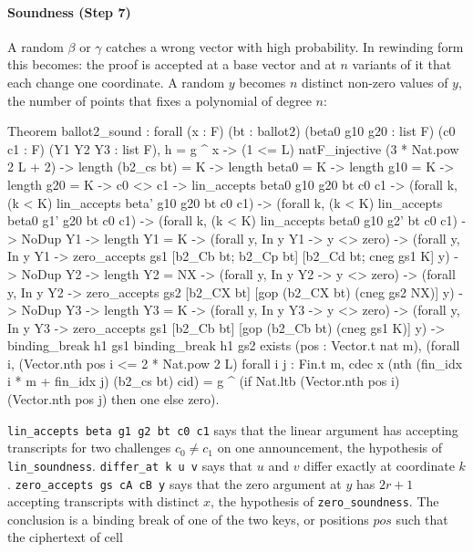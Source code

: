 \documentclass[11pt,a4paper]{article}
\newcommand{\rocq}[1]{\texttt{#1}}
\theoremstyle{remark}
\begin{document}
\paragraph{Soundness (Step 7)} A random $\beta$ or $\gamma$ catches a
wrong vector with high probability. In rewinding form this becomes: the
proof is accepted at a base vector and at $n$ variants of it that each
change one coordinate. A random $y$ becomes $n$ distinct non-zero values
of $y$, the number of points that fixes a polynomial of degree $n$:
\begin{coq}
Theorem ballot2_sound : forall (x : F) (bt : ballot2) (beta0 g10 g20 : list F)
  (c0 c1 : F) (Y1 Y2 Y3 : list F),
  h = g ^ x -> (1 <= L)%
  natF_injective (3 * Nat.pow 2 L + 2) ->
  length (b2_cs bt) = K -> length beta0 = K -> length g10 = K -> length g20 = K ->
  c0 <> c1 ->
  lin_accepts beta0 g10 g20 bt c0 c1 ->
  (forall k, (k < K)%
     lin_accepts beta' g10 g20 bt c0 c1) ->
  (forall k, (k < K)%
     lin_accepts beta0 g1' g20 bt c0 c1) ->
  (forall k, (k < K)%
     lin_accepts beta0 g10 g2' bt c0 c1) ->
  NoDup Y1 -> length Y1 = K -> (forall y, In y Y1 -> y <> zero) ->
  (forall y, In y Y1 -> zero_accepts gs1 [b2_Cb bt; b2_Cp bt] [b2_Cd bt; cneg gs1 K] y) ->
  NoDup Y2 -> length Y2 = NX -> (forall y, In y Y2 -> y <> zero) ->
  (forall y, In y Y2 -> zero_accepts gs2 [b2_CX bt] [gop (b2_CX bt) (cneg gs2 NX)] y) ->
  NoDup Y3 -> length Y3 = K -> (forall y, In y Y3 -> y <> zero) ->
  (forall y, In y Y3 -> zero_accepts gs1 [b2_Cb bt] [gop (b2_Cb bt) (cneg gs1 K)] y) ->
  binding_break h1 gs1 \/ binding_break h1 gs2 \/
  exists (pos : Vector.t nat m),
    (forall i, (Vector.nth pos i <= 2 * Nat.pow 2 L)%
    forall i j : Fin.t m,
      cdec x (nth (fin_idx i * m + fin_idx j) (b2_cs bt) cid) =
      g ^ (if Nat.ltb (Vector.nth pos i) (Vector.nth pos j) then one else zero).
\end{coq}
\rocq{lin\_accepts beta g1 g2 bt c0 c1} says that the linear argument has
accepting transcripts for two challenges $c_0 \ne c_1$ on one
announcement, the hypothesis of \rocq{lin\_soundness}. \rocq{differ\_at k
u v} says that $u$ and $v$ differ exactly at coordinate $k$.
\rocq{zero\_accepts gs cA cB y} says that the zero argument at $y$ has $2r
+ 1$ accepting transcripts with distinct $x$, the hypothesis of
\rocq{zero\_soundness}. The conclusion is a binding break of one of the
two keys, or positions $\mathit{pos}$ such that the ciphertext of cell
\end{document}
